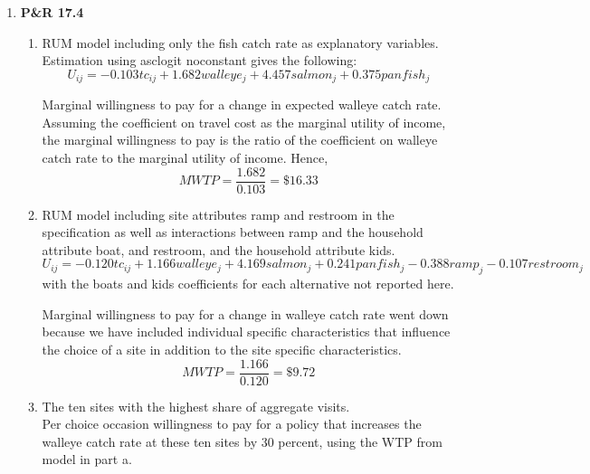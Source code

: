 \documentclass[12pt]{article}
\begin{document}
\begin {enumerate}
\begin{enumerate}
Estimating the average annual welfare loss from a $\$5$ per person beach access fee.\\
The beach access fee is a flat fee that would just be added to the travel cost of each individual. 
\[Y_i - \frac{exp(0.863 - 0.012 p_i)}{-0.012} = Y_i + CV_i - \frac{exp(0.863 - 0.012(p_i+5))}{-0.012} \]
\[CV_i =  \frac{exp(0.863 - 0.012 p_i) (exp(-.06) - 1)}{-0.012} = \frac{E(X_i) (1 - exp(-0.06)}{0.012} \] 
Hence for the sample, the average welfare loss is $CV_i = \frac{0.88 (1- exp(-0.06)}{0.012} = \$ 4.27$.\\
\end{enumerate}

\item \textbf{P\&R 17.4}
\begin{enumerate}
\item RUM model including only the fish catch rate as explanatory variables.\\
Estimation using asclogit noconstant gives the following:
\[ U_{ij} = -0.103 tc_{ij} + 1.682 walleye_j + 4.457 salmon_j + 0.375 panfish_j \]
 
Marginal willingness to pay for a change in expected walleye catch rate.\\
Assuming the coefficient on travel cost as the marginal utility of income, the marginal willingness to pay is the ratio of the coefficient on walleye catch rate to the marginal utility of income. Hence,
\[MWTP = \frac{1.682}{0.103} = \$16.33\]

\item RUM model including site attributes ramp and restroom in the specification as well as interactions between ramp and the household attribute boat, and restroom, and the household attribute kids.\\
\[ U_{ij} = -0.120 tc_{ij} + 1.166 walleye_j + 4.169 salmon_j + 0.241 panfish_j  - 0.388 ramp_j - 0.107 restroom_j \]
with the boats and kids coefficients for each alternative not reported here.

Marginal willingness to pay for a change in walleye catch rate went down because we have included individual specific characteristics that influence the choice of a site in addition to the site specific characteristics. \\
\[MWTP = \frac{1.166}{0.120} = \$9.72\]

\item The ten sites with the highest share of aggregate visits.\\
Per choice occasion willingness to pay for a policy that increases the walleye catch rate at these ten sites by 30 percent, using the WTP from model in part a.\\
\begin{tabular}{ |p{2cm}|p{2cm}| p{2cm}|p{3cm}|p{2cm}|}


\end{tabular}
\end{enumerate}
\end{enumerate}
\end{document}
